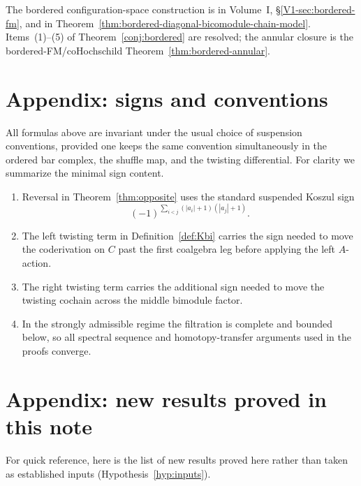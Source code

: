 \begin{remark}
The bordered configuration-space construction is in Volume~I,
\S\ref*{V1-sec:bordered-fm}, and in
Theorem~\ref{thm:bordered-diagonal-bicomodule-chain-model}. Items~(1)--(5)
of Theorem~\ref{conj:bordered} are resolved; the annular closure is
the bordered-FM/coHochschild Theorem~\ref{thm:bordered-annular}.
\end{remark}

\appendix

\section{Appendix: signs and conventions}

All formulas above are invariant under the usual choice of suspension conventions, provided one keeps
the same convention simultaneously in the ordered bar complex, the shuffle map, and the twisting
differential. For clarity we summarize the minimal sign content.

\begin{enumerate}[label=(\arabic*)]
\item Reversal in Theorem~\ref{thm:opposite} uses the standard suspended Koszul sign
\[
(-1)^{\sum_{i<j}(|a_i|+1)(|a_j|+1)}.
\]

\item The left twisting term in Definition~\ref{def:Kbi} carries the sign needed to move the
coderivation on $C$ past the first coalgebra leg before applying the left $A$-action.

\item The right twisting term carries the additional sign needed to move the twisting cochain across
the middle bimodule factor.

\item In the strongly admissible regime the filtration is complete and bounded below, so all spectral
sequence and homotopy-transfer arguments used in the proofs converge.
\end{enumerate}

\section{Appendix: new results proved in this note}

For quick reference, here is the list of new results proved here rather than taken as
established inputs (Hypothesis~\ref{hyp:inputs}).

